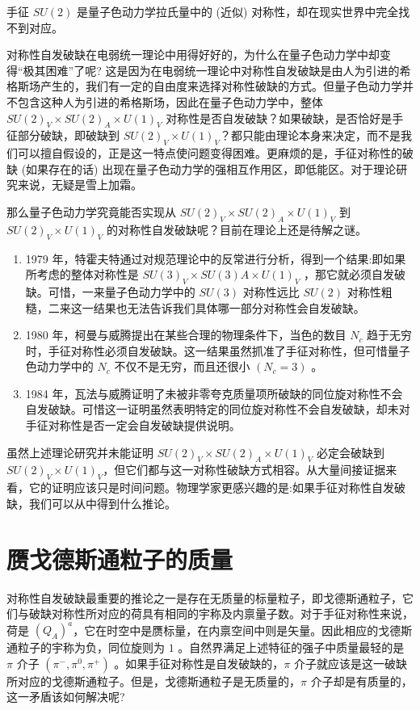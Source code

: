 \documentclass[oneside,a4paper,openany,11pt]{ctexbook}
\begin{document}
手征 $SU(2)$ 是量子色动力学拉氏量中的 (近似) 对称性，却在现实世界中完全找不到对应。

对称性自发破缺在电弱统一理论中用得好好的，为什么在量子色动力学中却变得“极其困难”了呢? 这是因为在电弱统一理论中对称性自发破缺是由人为引进的希格斯场产生的，我们有一定的自由度来选择对称性破缺的方式。但量子色动力学并不包含这种人为引进的希格斯场，因此在量子色动力学中，整体 $SU(2)_V \times SU(2)_A \times U(1)_V$ 对称性是否自发破缺？如果破缺，是否恰好是手征部分破缺，即破缺到 $SU(2)_V \times U(1)_V$？都只能由理论本身来决定，而不是我们可以擅自假设的，正是这一特点使问题变得困难。更麻烦的是，手征对称性的破缺 (如果存在的话) 出现在量子色动力学的强相互作用区，即低能区。对于理论研究来说，无疑是雪上加霜。

那么量子色动力学究竟能否实现从 $SU(2)_V \times SU(2)_A \times U(1)_V$ 到 $SU(2)_V \times U(1)_V$ 的对称性自发破缺呢？目前在理论上还是待解之谜。

\begin{enumerate}
    \item 1979 年，特霍夫特通过对规范理论中的反常进行分析，得到一个结果:即如果所考虑的整体对称性是 $SU(3)_V \times S U (3) A \times U(1)_V$ ，那它就必须自发破缺。可惜，一来量子色动力学中的 $SU(3)$ 对称性远比 $SU(2)$ 对称性粗糙，二来这一结果也无法告诉我们具体哪一部分对称性会自发破缺。
    \item 1980 年，柯曼与威腾提出在某些合理的物理条件下，当色的数目 $N_c$ 趋于无穷时，手征对称性必须自发破缺。这一结果虽然抓准了手征对称性，但可惜量子色动力学中的 $N_c$ 不仅不是无穷，而且还很小 $(N_c=3)$ 。
    \item 1984 年，瓦法与威腾证明了未被非零夸克质量项所破缺的同位旋对称性不会自发破缺。可惜这一证明虽然表明特定的同位旋对称性不会自发破缺，却未对手征对称性是否一定会自发破缺提供说明。
\end{enumerate}

虽然上述理论研究并未能证明 $SU(2)_V \times SU(2)_A \times U(1)_V$ 必定会破缺到 $SU(2)_V \times U(1)_V$，但它们都与这一对称性破缺方式相容。从大量间接证据来看，它的证明应该只是时间问题。物理学家更感兴趣的是:如果手征对称性自发破缺，我们可以从中得到什么推论。

\section{赝戈德斯通粒子的质量}

对称性自发破缺最重要的推论之一是存在无质量的标量粒子，即戈德斯通粒子，它们与破缺对称性所对应的荷具有相同的宇称及内禀量子数。对于手征对称性来说，荷是 $(Q_A)^a$，它在时空中是赝标量，在内禀空间中则是矢量。因此相应的戈德斯通粒子的宇称为负，同位旋则为 $1$ 。自然界满足上述特征的强子中质量最轻的是 $\pi$ 介子 $(\pi^-, \pi^0, \pi^+)$ 。如果手征对称性是自发破缺的，$\pi$ 介子就应该是这一破缺所对应的戈德斯通粒子。但是，戈德斯通粒子是无质量的，$\pi$ 介子却是有质量的，这一矛盾该如何解决呢?
\end{document}
